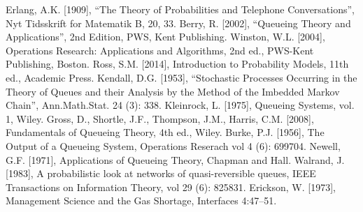 \newpage{}
\begin{thebibliography}{99}
 Erlang, A.K. [1909], ``The Theory of Probabilities and Telephone Conversations'', Nyt Tidsskrift for Matematik B, 20, 33.
 Berry, R. [2002], ``Queueing Theory and Applications'', 2nd Edition, PWS, Kent Publishing.
 Winston, W.L. [2004], Operations Research: Applications and Algorithms, 2nd ed., PWS-Kent Publishing, Boston.
 Ross, S.M. [2014], Introduction to Probability Models,  11th ed., Academic Press. 
 
 
 
 
 Kendall, D.G. [1953], ``Stochastic Processes Occurring in the Theory of Queues and their Analysis by the Method of the Imbedded Markov Chain'', Ann.Math.Stat. 24 (3): 338.
 Kleinrock, L. [1975], Queueing Systems, vol. 1, Wiley.
 Gross, D., Shortle, J.F., Thompson, J.M., Harris, C.M. [2008], Fundamentals of Queueing Theory, 4th ed., Wiley.
 Burke, P.J. [1956], The Output of a Queueing System, Operations Reserach vol 4 (6): 699704.
 Newell, G.F. [1971], Applications of Queueing Theory, Chapman and Hall.
 Walrand, J. [1983], A probabilistic look at networks of quasi-reversible queues, IEEE Transactions on Information Theory, vol 29 (6): 825831.
 
 Erickson, W. [1973], Management Science and the Gas Shortage, Interfaces 4:47–51.
\end{thebibliography}



